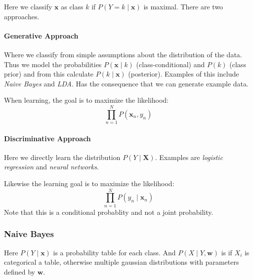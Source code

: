 Here we classify $\mathbf{x}$ as class $k$ if $P(Y = k \mid \mathbf{x})$ is maximal.
There are two approaches.

\paragraph{Generative Approach} Where we classify from simple assumptions about the distribution of the data.
    Thus we model the probabilities $P(\mathbf{x} \mid k)$ (class-conditional) and $P(k)$ (class prior) and from this calculate $P(k \mid \mathbf{x})$ (posterior).
    Examples of this include \emph{Naive Bayes} and \emph{LDA}.
    Has the consequence that we can generate example data.

    When learning, the goal is to maximize the likelihood:
    \[
        \prod_{n=1}^N P(\mathbf{x}_n, y_n)
    \]

\paragraph{Discriminative Approach} Here we directly learn the distribution $P(Y \mid \mathbf{X})$.
    Examples are \emph{logistic regression} and \emph{neural networks}.

    Likewise the learning goal is to maximize the likelihood:
    \[
        \prod_{n=1}^N P(y_n \mid \mathbf{x}_n)
    \]
    Note that this is a conditional probablity and not a joint probability.

\subsubsection{Naive Bayes}

\begin{figure}[H]
    \centering
\end{figure}

Here $P(Y \mid \mathbf{x})$ is a probability table for each class.
And $P(X \mid Y, \mathbf{w})$ is if $X_i$ is categorical a table, otherwise multiple gaussian distributions with parameters defined by $\mathbf{w}$.

